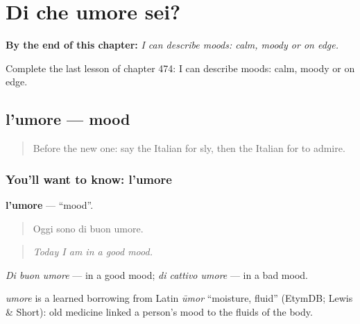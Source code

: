 
\chapter{Di che umore sei?}
\label{ch:it-di-che-umore-sei}

\begin{chapteropening}
\textbf{By the end of this chapter:} \emph{I can describe moods: calm, moody or on edge.}

Complete the last lesson of chapter 474: I can describe moods: calm, moody or on edge.
\end{chapteropening}

\section[l'umore]{l'umore — mood}

\label{lesson:IT-C474-umore}



\begin{quote}
Before the new one: say the Italian for sly, then the Italian for to admire.
\end{quote}

\subsection*{You'll want to know: l'umore}
\textbf{l'umore} — \textquotedblleft{}mood\textquotedblright{}.

\begin{quote}
Oggi sono di buon umore.
\end{quote}

\begin{quote}
\emph{Today I am in a good mood.}
\end{quote}

\emph{Di buon umore} — in a good mood; \emph{di cattivo umore} — in a bad mood.

\begin{cousinweb}
\emph{umore} is a learned borrowing from Latin \emph{ūmor} \textquotedblleft{}moisture, fluid\textquotedblright{} (EtymDB; Lewis \& Short): old medicine linked a person's mood to the fluids of the body.
\end{cousinweb}

